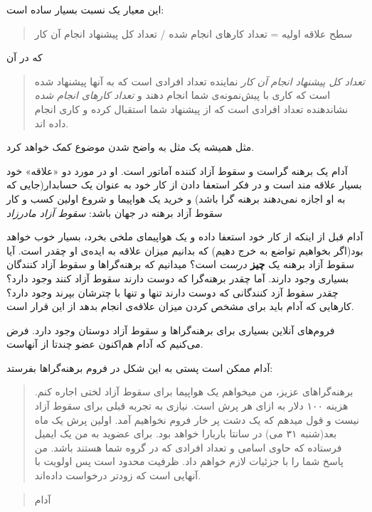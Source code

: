 این معیار یک نسبت بسیار ساده است:

\begin{quote}
سطح علاقه اولیه = تعداد کارهای انجام شده / تعداد کل پیشنهاد انجام آن کار
\end{quote}

که در آن

\begin{quote}
\emph{تعداد کل پیشنهاد انجام آن کار} نماینده تعداد افرادی است که به آنها
پیشنهاد شده است که کاری با پیش‌نمونه‌ی شما انجام دهند و \emph{تعداد
کارهای انجام شده} نشاندهنده تعداد افرادی است که از پیشنهاد شما استقبال
کرده و کاری انجام داده اند.
\end{quote}

مثل همیشه یک مثل به واضح شدن موضوع کمک خواهد کرد.

آدام یک برهنه گراست و سقوط آزاد کننده آماتور است. او در مورد دو «علاقه»
خود بسیار علاقه مند است و در فکر استعفا دادن از کار خود به عنوان یک
حسابدار(جایی که به او اجازه نمی‌دهند برهنه گرا باشد) و خرید یک هواپیما و
شروع اولین کسب و کار سقوط آزاد برهنه در جهان باشد: \emph{سقوط آزاد
مادرزاد}

آدام قبل از اینکه از کار خود استعفا داده و یک هواپیمای ملخی بخرد، بسیار
خوب خواهد بود(اگر بخواهیم تواضع به خرج دهیم) که بدانیم میزان علاقه به
ایده‌ی او چقدر است. آیا سقوط آزاد برهنه یک \textbf{چیز} \emph{درست} است؟
میدانیم که برهنه‌گراها و سقوط آزاد کنندگان بسیاری وجود دارند. آما چقدر
برهنه‌گرا که دوست دارند سقوط آزاد کنند وجود دارد؟ چقدر سقوط آزد کنندگانی
که دوست دارند تنها و تنها با چترشان بپرند وجود دارد؟ کارهایی که آدام
باید برای مشخص کردن میزان علاقه‌ی انجام بدهد از این قرار است.

فروم‌های آنلاین بسیاری برای برهنه‌گراها و سقوط آزاد دوستان وجود دارد.
فرض می‌کنیم که آدام هم‌اکنون عضو چندتا از آنهاست.

آدام ممکن است پستی به این شکل در فروم برهنه‌گراها بفرستد:

\begin{quote}
برهنه‌گراهای عزیز، من میخواهم یک هواپیما برای سقوط آزاد لختی اجاره کنم.
هزینه ۱۰۰ دلار به ازای هر پرش است. نیازی به تجربه قبلی برای سقوط آزاد
نیست و قول میدهم که یک دشت پر خار فروم نخواهیم آمد. اولین پرش یک ماه
بعد(شنبه ۳۱ می) در سانتا باربارا خواهد بود. برای عضوید به من یک ایمیل
فرستاده که حاوی اسامی و تعداد افرادی که در گروه شما هستند باشد. من پاسخ
شما را با جزئیات لازم خواهم داد. ظرفیت محدود است پس اولویت با آنهایی است
که زودتر درخواست داده‌اند.
\end{quote}

\begin{quote}
آدام
\end{quote}

